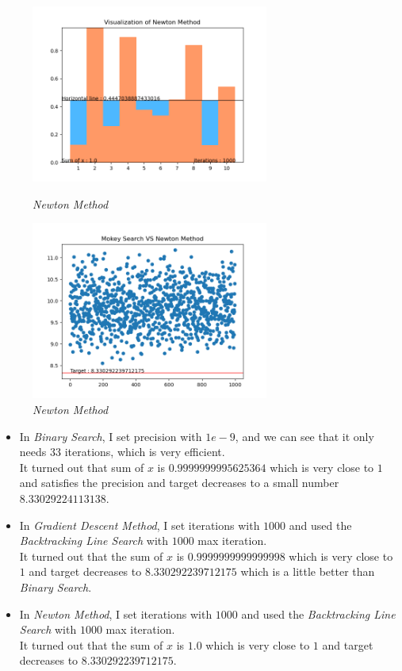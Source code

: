 \documentclass[12pt, a4paper, oneside]{article}
\begin{document}
\begin{figure}[H]
    \begin{minipage}[H]{0.5\linewidth} %
            \centering
            \includegraphics[width=7.8cm]{V of N.png}
            \caption{\textit{Newton Method}}
     \end{minipage}
     \begin{minipage}[H]{0.5\linewidth}
        \hspace{0.2mm}
         \includegraphics[width=7.8cm]{M of N.png}
         \caption{\textit{Newton Method}}
      \end{minipage}
\end{figure}
\begin{itemize}
    \item 
    {
        In \textit{Binary Search}, I set precision with $1e-9$, and we can see that it only needs $33$ iterations, which is very efficient.\\
        It turned out that sum of $x$ is $0.9999999995625364$ which is very close to $1$ and satisfies the precision and target decreases to a small number $8.33029224113138$.
    }
    \item 
    {
        In \textit{Gradient Descent Method}, I set iterations with $1000$ and used the \textit{Backtracking Line Search} with $1000$ max iteration.\\
        It turned out that the sum of $x$ is $0.9999999999999998$ which is very close to $1$ and target decreases to $8.330292239712175$ which is a little better than \textit{Binary Search}.
    }
    \item 
    {
        In \textit{Newton Method}, I set iterations with $1000$ and used the \textit{Backtracking Line Search} with $1000$ max iteration.\\
        It turned out that the sum of $x$ is $1.0$ which is very close to $1$ and target decreases to $8.330292239712175$.
    }
\end{itemize}
\end{document}

